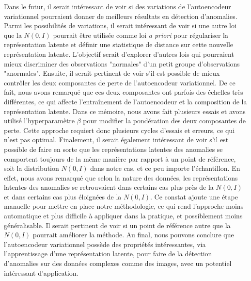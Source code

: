 Dans le futur, il serait intéressant de voir si des variations de l'autoencodeur variationnel pourraient donner de meilleurs résultats en détection d'anomalies. Parmi les possibilités de variations, il serait intéressant de voir si une autre loi que la $N(0,I)$ pourrait être utilisée comme loi \textit{a priori} pour régulariser la représentation latente et définir une statistique de distance sur cette nouvelle représentation latente. L'objectif serait d'explorer d'autres lois qui pourraient mieux discriminer des observations "normales" d'un petit groupe d'observations "anormales". Ensuite, il serait pertinent de voir s'il est possible de mieux contrôler les deux composantes de perte de l'autoencodeur variationnel. De ce fait, nous avons remarqué que ces deux composantes ont parfois des échelles très différentes, ce qui affecte l'entraînement de l'autoencodeur et la composition de la représentation latente. Dans ce mémoire, nous avons fait plusieurs essais et avons utilisé l'hyperparamètre $\beta$  pour modifier la pondération des deux composantes de perte. Cette approche requiert donc plusieurs cycles d'essais et erreurs, ce qui n'est pas optimal. Finalement, il serait également intéressant de voir s'il est possible de faire en sorte que les représentations latentes des anomalies se comportent toujours de la même manière par rapport à un point de référence, soit la distribution $N(0,I)$ dans notre cas, et ce peu importe l'échantillon. En effet, nous avons remarqué que selon la nature des données, les représentations latentes des anomalies se retrouvaient dans certains cas plus près de la $N(0,I)$ et dans certains cas  plus éloignées de la $N(0,I)$. Ce constat ajoute une étape manuelle pour mettre en place notre méthodologie, ce qui rend l'approche moins automatique et plus difficile à appliquer dans la pratique, et possiblement moins généralisable. Il serait pertinent de voir si un point de référence autre que la $N(0,I)$ pourrait améliorer la méthode. Au final, nous pouvons conclure que l'autoencodeur variationnel possède des propriétés intéressantes, via l'apprentissage d'une représentation latente, pour faire de la détection d'anomalies sur des données complexes comme des images, avec un potentiel intéressant d'application.


